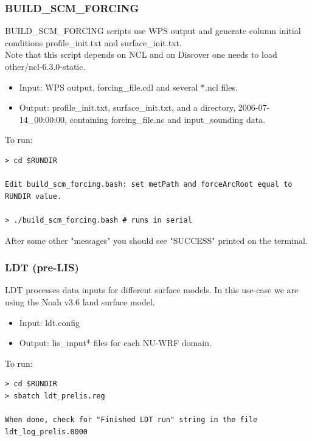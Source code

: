 \begin{frame}[fragile]\frametitle{BUILD\_SCM\_FORCING}

\footnotesize{
BUILD\_SCM\_FORCING scripts use WPS output and generate column initial conditions profile\_init.txt and surface\_init.txt. \\
Note that this script depends on NCL and on Discover one needs to load other/ncl-6.3.0-static.
\begin{itemize}
\item Input: WPS output, forcing\_file.cdl and several *.ncl files.
\item Output: profile\_init.txt, surface\_init.txt, and a directory, 2006-07-14\_00:00:00,  containing forcing\_file.nc and input\_sounding data.
\end{itemize}
}    
\hrulefill\par
\footnotesize{To run:}
\begin{lstlisting}
> cd $RUNDIR

Edit build_scm_forcing.bash: set metPath and forceArcRoot equal to RUNDIR value.

> ./build_scm_forcing.bash # runs in serial
\end{lstlisting}
After some other "messages" you should see "SUCCESS" printed on the terminal.
\end{frame}

\begin{frame}[fragile]\frametitle{LDT (pre-LIS)}

\footnotesize{
LDT processes data inputs for different surface models. In this use-case  we are using the Noah v3.6 land surface model.
\begin{itemize}
\item Input: ldt.config
\item Output: lis\_input* files for each NU-WRF domain.
\end{itemize}
}    
\hrulefill\par
\footnotesize{To run:}
\begin{lstlisting}
> cd $RUNDIR
> sbatch ldt_prelis.reg

When done, check for "Finished LDT run" string in the file ldt_log_prelis.0000
\end{lstlisting}

\end{frame}

